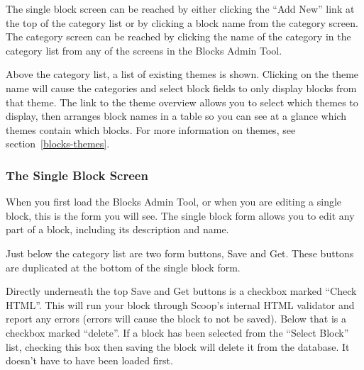 The single block screen can be reached by either clicking the ``Add New'' link at the top of the category list or by clicking a block name from the category screen. The category screen can be reached by clicking the name of the category in the category list from any of the screens in the Blocks Admin Tool. 

Above the category list, a list of existing themes is shown.  Clicking on the theme name will cause the categories and select block fields to only display blocks from that theme.  The link to the theme overview allows you to select which themes to display, then arranges block names in a table so you can see at a glance which themes contain which blocks.  For more information on themes, see section~\ref{blocks-themes}.

\subsubsection{The Single Block Screen}

When you first load the Blocks Admin Tool, or when you are editing a single block, this is the form you will see. The single block form allows you to edit any part of a block, including its description and name.

Just below the category list are two form buttons, Save and Get. These buttons are duplicated at the bottom of the single block form.

Directly underneath the top Save and Get buttons is a checkbox marked ``Check HTML''. This will run your block through Scoop's internal HTML validator and report any errors (errors will cause the block to not be saved).  Below that is a checkbox marked ``delete''. If a block has been selected from the ``Select Block'' list, checking this box then saving the block will delete it from the database. It doesn't have to have been loaded first.

